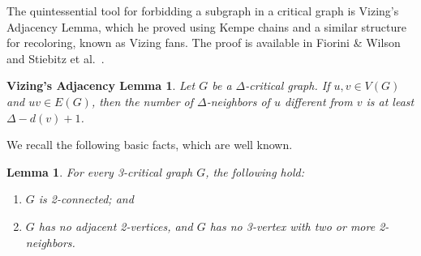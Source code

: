 \documentclass[12pt]{article}
\theoremstyle{plain}
\newtheorem*{VAL}{Vizing's Adjacency Lemma}
\newtheorem{lem}[prop]{Lemma}
\theoremstyle{definition}
\theoremstyle{remark}
\begin{document}
The quintessential tool for forbidding a subgraph in a critical graph is Vizing's
Adjacency Lemma, which he proved using Kempe chains and a similar structure
for recoloring, known as Vizing fans.
The proof is available in Fiorini \& Wilson~\cite[p. 72--74]{FioriniW77} and 
Stiebitz et al.~\cite{StiebitzSTF12}. 

\begin{VAL}
Let $G$ be a $\Delta$-critical graph.  If $u,v\in V(G)$ and $uv\in E(G)$, then
the number of $\Delta$-neighbors of $u$ different from $v$ is at least $\Delta-d(v)+1$.
\end{VAL}
\noindent


We recall the following basic facts, which are well known.

\begin{lem}
For every 3-critical graph $G$, the following hold:
\begin{enumerate}
\item[(a)] $G$ is 2-connected; and
\item[(b)] $G$ has no adjacent 2-vertices, and $G$ has no 3-vertex with two or more 2-neighbors.
\label{lem:basic}
\end{enumerate}
\end{lem}
\end{document}
